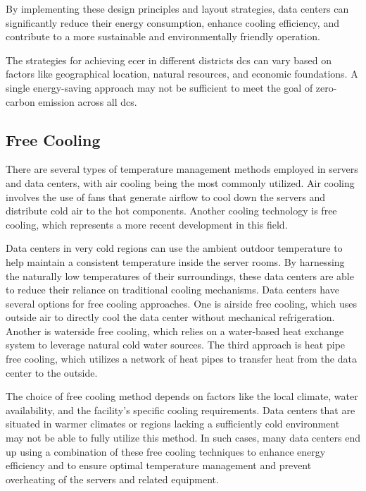 \documentclass[
  a4paper,  %
  twoside,  %
  bibliography=totoc,
  headsepline,
  cleardoublepage=empty,
  parskip=half,
  draft=false
]{scrbook}
\begin{document}
By implementing these design principles and layout strategies, data centers can significantly reduce their energy consumption, enhance cooling efficiency, and contribute to a more sustainable and environmentally friendly operation.

The strategies for achieving \gls{ecer} in different districts \gls{dc}s can vary based on factors like geographical location, natural resources, and economic foundations. A single energy-saving approach may not be sufficient to meet the goal of zero-carbon emission across all \gls{dc}s\cite{malkamaki2012solar}.


\subsection{Free Cooling}
There are several types of temperature management methods employed in servers and data centers, with air cooling being the most commonly utilized. Air cooling involves the use of fans that generate airflow to cool down the servers and distribute cold air to the hot components. Another cooling technology is free cooling\cite{data4groupCloserLook}, which represents a more recent development in this field.

Data centers in very cold regions can use the ambient outdoor temperature to help maintain a consistent temperature inside the server rooms\cite{data4groupCloserLook}. By harnessing the naturally low temperatures of their surroundings, these data centers are able to reduce their reliance on traditional cooling mechanisms. Data centers have several options for free cooling approaches. One is airside free cooling, which uses outside air to directly cool the data center without mechanical refrigeration. Another is waterside free cooling, which relies on a water-based heat exchange system to leverage natural cold water sources. The third approach is heat pipe free cooling, which utilizes a network of heat pipes to transfer heat from the data center to the outside. 

The choice of free cooling method depends on factors like the local climate, water availability, and the facility's specific cooling requirements. Data centers that are situated in warmer climates or regions lacking a sufficiently cold environment may not be able to fully utilize this method. In such cases, many data centers end up using a combination of these free cooling techniques to enhance energy efficiency and to ensure optimal temperature management and prevent overheating of the servers and related equipment\cite{zhang2014free}.
\end{document}
